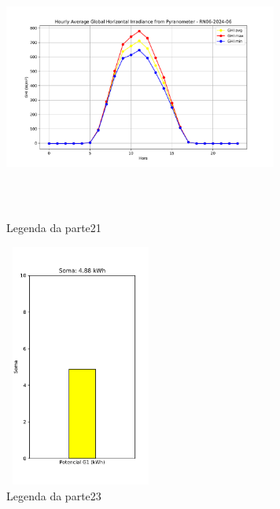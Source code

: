 \documentclass{article}
\begin{document}
\begin{figure}[ht]  %
    \centering
    \begin{minipage}[b]{0.49\textwidth} %
        \centering
        \includegraphics[width=9cm, height=8cm]{parte23.pdf}
        \caption{Legenda da parte21}
        \label{fig:parte21}
    \end{minipage}%
    \hspace{0.01\textwidth} %
    \begin{minipage}[b]{0.49\textwidth} %
        \centering
        \includegraphics[width=5cm, height=8cm]{parte21.pdf}
        \caption{Legenda da parte23}
        \label{fig:parte23}
    \end{minipage}
\end{figure}
\newpage
\end{document}
